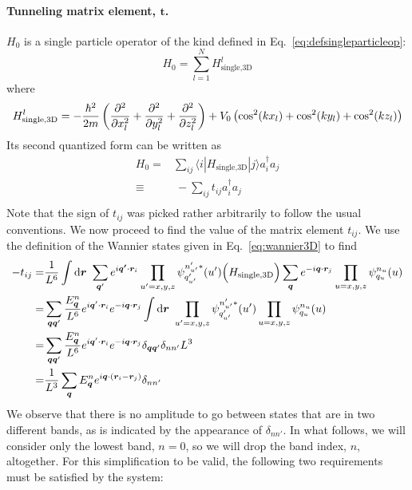 \paragraph{Tunneling matrix element, $\bm{t}$.} $H_{0}$ is a single particle
operator of the kind defined in Eq.~\ref{eq:defsingleparticleop}:
\begin{equation}
  H_{0} = 
     \sum_{l=1}^{N} H_{\text{single,3D}}^{l}
\end{equation}
where 
\begin{equation}
H_{\text{single,3D}}^{l} = 
  -\frac{\hbar^{2}}{2m} \left( \frac{\partial^{2}}{\partial x_{l}^{2}}
                            + \frac{\partial^{2}}{\partial y_{l}^{2}}
                            + \frac{\partial^{2}}{\partial z_{l}^{2}} \right)
 + V_{0}\left( \cos^{2}(kx_{l})  + \cos^{2}(ky_{l}) + \cos^{2}(kz_{l}) \right) 
\end{equation}
Its second quantized form can be written as 
\begin{equation}
\begin{split}
  H_{0} = & \sum_{ij} 
       \langle i| H_{\text{single,3D}} |j \rangle a_{i}^{\dagger} a_{j} \\
        \equiv & ~ -\sum_{ij} t_{ij}  a_{i}^{\dagger} a_{j} \\
\end{split}
\end{equation}  
Note that the sign of $t_{ij}$ was picked rather arbitrarily to follow the
usual conventions.  We now proceed to find the value of the matrix element
$t_{ij}$.  We use the definition of the Wannier states given in
Eq.~\ref{eq:wannier3D} to find 
\begin{equation}
\begin{split}
-t_{ij}  
= & 
  \frac{1}{L^{6}}\int \mathrm{d}\bv{r}\ 
     \sum_{\bv{q}'} e^{i \bv{q'}\cdot\bv{r}_{i} }
     \prod_{u'=x,y,z}  \psi_{q'_{u'}}^{n'_{u'}*}(u') 
  \Big( H_{\text{single,3D}}  \Big)
     \sum_{\bv{q}} e^{-i \bv{q}\cdot\bv{r}_{j} }
     \prod_{u=x,y,z}  \psi_{q_{u}}^{n_{u}}(u)\\ 
= &
  \sum_{\bv{q}\bv{q}'}   
  \frac{E_{\bv{q}}^{n}}{L^{6}}
   e^{ i \bv{q}'\cdot\bv{r}_{i} }  e^{ -i \bv{q}\cdot\bv{r}_{j} }
   \int\mathrm{d}\bv{r}\ 
     \prod_{u'=x,y,z}  \psi_{q'_{u'}}^{n'_{u'}*}(u') 
     \prod_{u=x,y,z}  \psi_{q_{u}}^{n_{u}}(u) \\ 
= &
  \sum_{\bv{q}\bv{q}'}   
  \frac{E_{\bv{q}}^{n}}{L^{6}}
   e^{ i \bv{q}'\cdot\bv{r}_{i} }  e^{ -i \bv{q}\cdot\bv{r}_{j} }
   \delta_{\bv{q}\bv{q}'} \delta_{nn'} L^{3} \\
= &
  \frac{1}{L^{3}}
  \sum_{\bv{q}}   E_{\bv{q}}^{n}
   e^{ i \bv{q}\cdot(\bv{r}_{i} - \bv{r}_{j}) } \delta_{nn'}\\
\end{split} 
\end{equation}
We observe that there is no amplitude to go between states that are in two
different bands, as is indicated by the appearance of $\delta_{nn'}$.   In what
follows, we will consider only the lowest band, $n=0$,  so we will drop the
band index, $n$, altogether.  For this simplification to be valid, the
following two requirements must be satisfied by the system:
 
